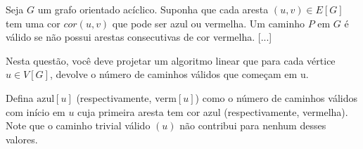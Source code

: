 Seja $G$ um grafo orientado acíclico. Suponha que cada aresta $(u, v) \in E[G]$ tem uma cor $cor(u, v)$ que pode ser azul ou vermelha. Um caminho $P$ em $G$ é válido se não possui arestas consecutivas de cor vermelha. [...]

Nesta questão, você deve projetar um algoritmo linear que para cada vértice $u \in V[G]$, devolve o número de caminhos válidos que começam em u.

\newcommand{\azul}{\mathrm{azul}\xspace}
\newcommand{\verm}{\mathrm{verm}\xspace}

\begin{definition*}
    Defina $\azul[u]$ (respectivamente, $\verm[u]$) como o número de caminhos válidos com início em $u$ cuja primeira aresta tem cor azul (respectivamente, vermelha). Note que o caminho trivial válido $(u)$ não contribui para nenhum desses valores.
\end{definition*}

\itemdsep


